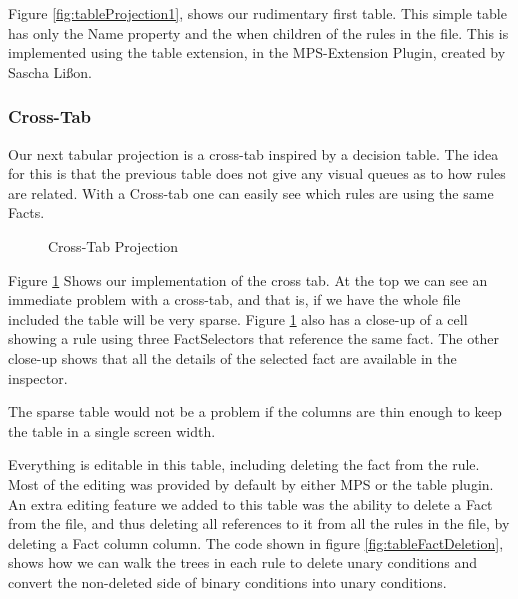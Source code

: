 Figure \ref{fig:tableProjection1}, shows our rudimentary first table.
This simple table has only the Name property and the when children of the rules in the file.
This is implemented using the table extension, in the MPS-Extension Plugin, created by Sascha Lißon.

\subsubsection{Cross-Tab}
Our next tabular projection is a cross-tab inspired by a decision table. 
The idea for this is that the previous table does not give any visual queues as to how rules are related.
With a Cross-tab one can easily see which rules are using the same Facts.

\begin{figure}[h]
    \centering
    \caption{Cross-Tab Projection}
    \label{fig:crosstabProjection1}
\end{figure}

Figure \ref{fig:crosstabProjection1} Shows our implementation of the cross tab.  
At the top we can see an immediate problem with a cross-tab, and that is, if we have the whole file included the table will be very sparse.
Figure \ref{fig:crosstabProjection1} also has a close-up of a cell showing a rule using three FactSelectors that reference the same fact.
The other close-up shows that all the details of the selected fact are available in the inspector.

The sparse table would not be a problem if the columns are thin enough to keep the table in a single screen width.  

Everything is editable in this table, including deleting the fact from the rule.
Most of the editing was provided by default by either MPS or the table plugin.
An extra editing feature we added to this table was the ability to delete a Fact from the file, and thus deleting all references to it from all the rules in the file, by deleting a Fact column column.
The code shown in figure \ref{fig:tableFactDeletion}, shows how we can walk the trees in each rule to delete unary conditions and convert the non-deleted side of binary conditions into unary conditions. 

